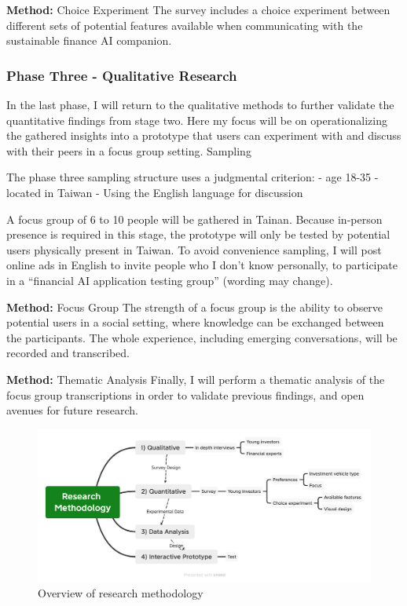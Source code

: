 \documentclass[
  letterpaper,
  DIV=11,
  numbers=noendperiod]{scrartcl}
\begin{document}
\textbf{Method:} Choice Experiment The survey includes a choice
experiment between different sets of potential features available when
communicating with the sustainable finance AI companion.

\subsubsection{Phase Three - Qualitative
Research}\label{phase-three---qualitative-research}

In the last phase, I will return to the qualitative methods to further
validate the quantitative findings from stage two. Here my focus will be
on operationalizing the gathered insights into a prototype that users
can experiment with and discuss with their peers in a focus group
setting. Sampling

The phase three sampling structure uses a judgmental criterion: - age
18-35 - located in Taiwan - Using the English language for discussion

A focus group of 6 to 10 people will be gathered in Tainan. Because
in-person presence is required in this stage, the prototype will only be
tested by potential users physically present in Taiwan. To avoid
convenience sampling, I will post online ads in English to invite people
who I don't know personally, to participate in a ``financial AI
application testing group'' (wording may change).

\textbf{Method:} Focus Group The strength of a focus group is the
ability to observe potential users in a social setting, where knowledge
can be exchanged between the participants. The whole experience,
including emerging conversations, will be recorded and transcribed.

\textbf{Method:} Thematic Analysis Finally, I will perform a thematic
analysis of the focus group transcriptions in order to validate previous
findings, and open avenues for future research.

\begin{figure}[H]

{\centering \includegraphics[width=1\textwidth,height=\textheight]{./images/methodology/research-methodology.png}

}

\caption{Overview of research methodology}

\end{figure}%
\end{document}
